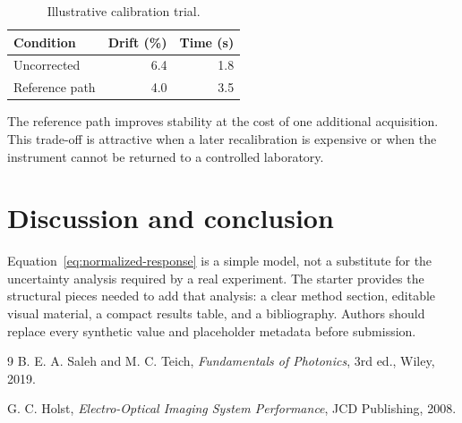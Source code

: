 \documentclass[10pt,letterpaper]{article}
\begin{document}
\begin{table}[t]
  \centering
  \caption{Illustrative calibration trial.}
  \label{tab:trial}
  \begin{tabular}{lrr}
    \toprule
    Condition & Drift (\%) & Time (s)\\
    \midrule
    Uncorrected & 6.4 & 1.8\\
    Reference path & 4.0 & 3.5\\
    \bottomrule
  \end{tabular}
\end{table}

The reference path improves stability at the cost of one additional acquisition.
This trade-off is attractive when a later recalibration is expensive or when
the instrument cannot be returned to a controlled laboratory.

\section{Discussion and conclusion}
Equation~\ref{eq:normalized-response} is a simple model, not a substitute for
the uncertainty analysis required by a real experiment. The starter provides
the structural pieces needed to add that analysis: a clear method section,
editable visual material, a compact results table, and a bibliography. Authors
should replace every synthetic value and placeholder metadata before submission.

\begin{thebibliography}{9}
B. E. A. Saleh and M. C. Teich, \emph{Fundamentals of Photonics}, 3rd ed.,
Wiley, 2019.

G. C. Holst, \emph{Electro-Optical Imaging System Performance}, JCD Publishing,
2008.
\end{thebibliography}
\end{document}
